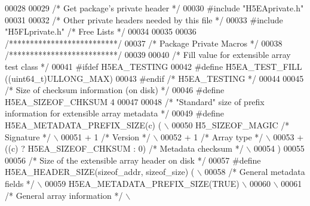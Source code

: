 \begin{DoxyCode}
00028 
00029 \textcolor{comment}{/* Get package's private header */}
00030 \textcolor{preprocessor}{#include "H5EAprivate.h"}
00031 
00032 \textcolor{comment}{/* Other private headers needed by this file */}
00033 \textcolor{preprocessor}{#include "H5FLprivate.h"}    \textcolor{comment}{/* Free Lists                           */}
00034 
00035 
00036 \textcolor{comment}{/**************************/}
00037 \textcolor{comment}{/* Package Private Macros */}
00038 \textcolor{comment}{/**************************/}
00039 
00040 \textcolor{comment}{/* Fill value for extensible array test class */}
00041 \textcolor{preprocessor}{#ifdef H5EA\_TESTING}
00042 \textcolor{preprocessor}{#define H5EA\_TEST\_FILL          ((uint64\_t)ULLONG\_MAX)}
00043 \textcolor{preprocessor}{#endif }\textcolor{comment}{/* H5EA\_TESTING */}\textcolor{preprocessor}{}
00044 
00045 \textcolor{comment}{/* Size of checksum information (on disk) */}
00046 \textcolor{preprocessor}{#define H5EA\_SIZEOF\_CHKSUM      4}
00047 
00048 \textcolor{comment}{/* "Standard" size of prefix information for extensible array metadata */}
00049 \textcolor{preprocessor}{#define H5EA\_METADATA\_PREFIX\_SIZE(c) (                                        \(\backslash\)}
00050 \textcolor{preprocessor}{    H5\_SIZEOF\_MAGIC   }\textcolor{comment}{/* Signature */}\textcolor{preprocessor}{                                         \(\backslash\)}
00051 \textcolor{preprocessor}{    + 1 }\textcolor{comment}{/* Version */}\textcolor{preprocessor}{                                                         \(\backslash\)}
00052 \textcolor{preprocessor}{    + 1 }\textcolor{comment}{/* Array type */}\textcolor{preprocessor}{                                                      \(\backslash\)}
00053 \textcolor{preprocessor}{    + ((c) ? H5EA\_SIZEOF\_CHKSUM : 0) }\textcolor{comment}{/* Metadata checksum */}\textcolor{preprocessor}{                  \(\backslash\)}
00054 \textcolor{preprocessor}{    )}
00055 
00056 \textcolor{comment}{/* Size of the extensible array header on disk */}
00057 \textcolor{preprocessor}{#define H5EA\_HEADER\_SIZE(sizeof\_addr, sizeof\_size) (                          \(\backslash\)}
00058 \textcolor{preprocessor}{    }\textcolor{comment}{/* General metadata fields */}\textcolor{preprocessor}{                                             \(\backslash\)}
00059 \textcolor{preprocessor}{    H5EA\_METADATA\_PREFIX\_SIZE(TRUE)                                           \(\backslash\)}
00060 \textcolor{preprocessor}{                                                                              \(\backslash\)}
00061 \textcolor{preprocessor}{    }\textcolor{comment}{/* General array information */}\textcolor{preprocessor}{                                           \(\backslash\)}

\end{DoxyCode}
